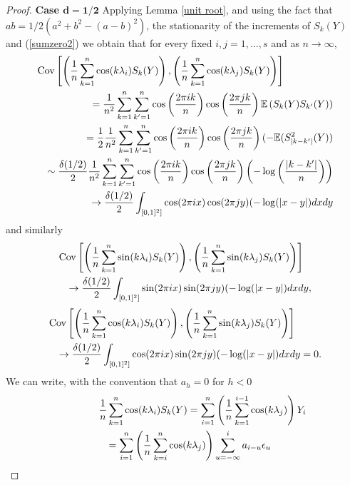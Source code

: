 \documentclass[12pt]{article}
\begin{document}
\begin{proof}
{\bf Case $\mathbf{d=1/2}$}
Applying Lemma \ref{unit root}, and using the fact that $ab=1/2\left(a^2+b^2-(a-b)^2\right)$, the stationarity of the increments of $S_k(Y)$ and (\ref{sumzero2}) we obtain that for every fixed $i,j=1,\ldots,s$ and as $n\to\infty$, 
\begin{eqnarray*}\lefteqn{
    \textrm{Cov}\left[\left(\frac{1}{n}\sum_{k=1}^n\cos(k\lambda_{i})S_k(Y)\right),\left(\frac{1}{n}\sum_{k=1}^n\cos(k\lambda_{j})S_k(Y)\right)\right]}\\
    &&=\frac{1}{n^2}\sum_{k=1}^n\sum_{k'=1}^n\cos\left(\frac{2\pi ik}{n}\right)\cos\left(\frac{2\pi jk}{n}\right)\mathbb{E}\left(S_k(Y)S_{k'}(Y)\right)\\ 
    &&=\frac{1}{2}\frac{1}{n^2}\sum_{k=1}^n\sum_{k'=1}^n\cos\left(\frac{2\pi ik}{n}\right)\cos\left(\frac{2\pi jk}{n}\right)(-\mathbb{E}(S^2_{\vert k-k'\vert}(Y))\\
    &&\sim\frac{\delta(1/2)}{2}\frac{1}{n^2}\sum_{k=1}^n\sum_{k'=1}^n\cos\left(\frac{2\pi ik}{n}\right)\cos\left(\frac{2\pi jk}{n}\right)\left(-\log\left(\frac{\vert k-k'\vert}{n}\right)\right)\\
&&\to\frac{\delta(1/2)}{2}\int_{[0,1]^2]}\cos(2\pi ix)\cos(2\pi jy)(-\log(\vert x- y\vert)dxdy
\end{eqnarray*}
and similarly
\begin{eqnarray*}\lefteqn{
    \textrm{Cov}\left[\left(\frac{1}{n}\sum_{k=1}^n\sin(k\lambda_{i})S_k(Y)\right),\left(\frac{1}{n}\sum_{k=1}^n\sin(k\lambda_{j})S_k(Y)\right)\right]}\\
&&\to\frac{\delta(1/2)}{2}\int_{[0,1]^2]}\sin(2\pi ix)\sin(2\pi jy)(-\log(\vert x- y\vert)dxdy,
\end{eqnarray*}
\begin{eqnarray*}\lefteqn{
    \textrm{Cov}\left[\left(\frac{1}{n}\sum_{k=1}^n\cos(k\lambda_{i})S_k(Y)\right),\left(\frac{1}{n}\sum_{k=1}^n\sin(k\lambda_{j})S_k(Y)\right)\right]}\\
   && \to\frac{\delta(1/2)}{2}\int_{[0,1]^2]}\cos(2\pi ix)\sin(2\pi jy)(-\log(\vert x- y\vert)dxdy=0.
   \end{eqnarray*}
   We can write,   with the convention that $a_h=0$ for $h<0$
\begin{eqnarray}\lefteqn{
\frac{1}{n}\sum_{k=1}^n\cos(k\lambda_{i})S_k(Y)
=\sum_{i=1}^n\left(\frac{1}{n}\sum_{k=1}^{i-1}\cos(k\lambda_j)\right)Y_i}\label{develop}\\
&&=
\sum_{i=1}^n\left(\frac{1}{n}\sum_{k=i}^n\cos(k\lambda_j)\right)
\sum_{u=-\infty}^ia_{i-u}\epsilon_u\nonumber\\

\end{eqnarray}
\end{proof}
\end{document}
